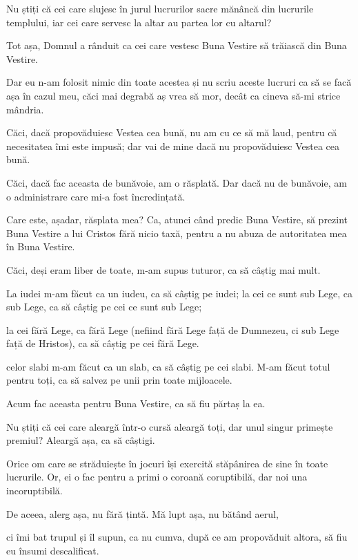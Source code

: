 {Nu știți că cei care slujesc în jurul lucrurilor sacre mănâncă din lucrurile templului, iar cei care servesc la altar au partea lor cu altarul?

Tot așa, Domnul a rânduit ca cei care vestesc Buna Vestire să trăiască din Buna Vestire.


\par }{\PP {}Dar eu n-am folosit nimic din toate acestea și nu scriu aceste lucruri ca să se facă așa în cazul meu, căci mai degrabă aș vrea să mor, decât ca cineva să-mi strice mândria.

Căci, dacă propovăduiesc Vestea cea bună, nu am cu ce să mă laud, pentru că necesitatea îmi este impusă; dar vai de mine dacă nu propovăduiesc Vestea cea bună.

Căci, dacă fac aceasta de bunăvoie, am o răsplată. Dar dacă nu de bunăvoie, am o administrare care mi-a fost încredințată.

Care este, așadar, răsplata mea? Ca, atunci când predic Buna Vestire, să prezint Buna Vestire a lui Cristos fără nicio taxă, pentru a nu abuza de autoritatea mea în Buna Vestire.


\par }{\PP {}Căci, deși eram liber de toate, m-am supus tuturor, ca să câștig mai mult.

La iudei m-am făcut ca un iudeu, ca să câștig pe iudei; la cei ce sunt sub Lege, ca sub Lege, ca să câștig pe cei ce sunt sub Lege;

la cei fără Lege, ca fără Lege (nefiind fără Lege față de Dumnezeu, ci sub Lege față de Hristos), ca să câștig pe cei fără Lege.

celor slabi m-am făcut ca un slab, ca să câștig pe cei slabi. M-am făcut totul pentru toți, ca să salvez pe unii prin toate mijloacele.

Acum fac aceasta pentru Buna Vestire, ca să fiu părtaș la ea.

Nu știți că cei care aleargă într-o cursă aleargă toți, dar unul singur primește premiul? Aleargă așa, ca să câștigi.

Orice om care se străduiește în jocuri își exercită stăpânirea de sine în toate lucrurile. Or, ei o fac pentru a primi o coroană coruptibilă, dar noi una incoruptibilă.

De aceea, alerg așa, nu fără țintă. Mă lupt așa, nu bătând aerul,

ci îmi bat trupul și îl supun, ca nu cumva, după ce am propovăduit altora, să fiu eu însumi descalificat.



}
